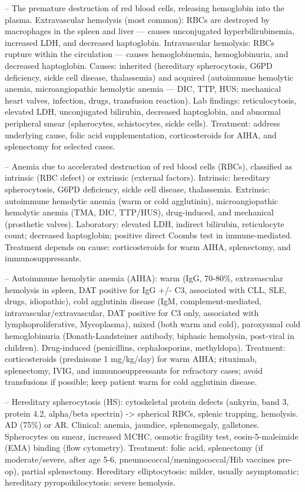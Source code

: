 -- The premature destruction of red blood cells, releasing hemoglobin into the plasma. Extravascular hemolysis (most common): RBCs are destroyed by macrophages in the spleen and liver — causes unconjugated hyperbilirubinemia, increased LDH, and decreased haptoglobin. Intravascular hemolysis: RBCs rupture within the circulation — causes hemoglobinemia, hemoglobinuria, and decreased haptoglobin. Causes: inherited (hereditary spherocytosis, G6PD deficiency, sickle cell disease, thalassemia) and acquired (autoimmune hemolytic anemia, microangiopathic hemolytic anemia — DIC, TTP, HUS; mechanical heart valves, infection, drugs, transfusion reaction). Lab findings: reticulocytosis, elevated LDH, unconjugated bilirubin, decreased haptoglobin, and abnormal peripheral smear (spherocytes, schistocytes, sickle cells). Treatment: address underlying cause, folic acid supplementation, corticosteroids for AIHA, and splenectomy for selected cases.

-- Anemia due to accelerated destruction of red blood cells (RBCs), classified as intrinsic (RBC defect) or extrinsic (external factors). Intrinsic: hereditary spherocytosis, G6PD deficiency, sickle cell disease, thalassemia. Extrinsic: autoimmune hemolytic anemia (warm or cold agglutinin), microangiopathic hemolytic anemia (TMA, DIC, TTP/HUS), drug-induced, and mechanical (prosthetic valves). Laboratory: elevated LDH, indirect bilirubin, reticulocyte count; decreased haptoglobin; positive direct Coombs test in immune-mediated. Treatment depends on cause: corticosteroids for warm AIHA, splenectomy, and immunosuppressants.

-- Autoimmune hemolytic anemia (AIHA): warm (IgG, 70-80\%, extravascular hemolysis in spleen, DAT positive for IgG +/- C3, associated with CLL, SLE, drugs, idiopathic), cold agglutinin disease (IgM, complement-mediated, intravascular/extravascular, DAT positive for C3 only, associated with lymphoproliferative, Mycoplasma), mixed (both warm and cold), paroxysmal cold hemoglobinuria (Donath-Landsteiner antibody, biphasic hemolysin, post-viral in children). Drug-induced (penicillins, cephalosporins, methyldopa). Treatment: corticosteroids (prednisone 1 mg/kg/day) for warm AIHA; rituximab, splenectomy, IVIG, and immunosuppressants for refractory cases; avoid transfusions if possible; keep patient warm for cold agglutinin disease.

-- Hereditary spherocytosis (HS): cytoskeletal protein defects (ankyrin, band 3, protein 4.2, alpha/beta spectrin) -> spherical RBCs, splenic trapping, hemolysis. AD (75\%) or AR. Clinical: anemia, jaundice, splenomegaly, gallstones. Spherocytes on smear, increased MCHC, osmotic fragility test, eosin-5-maleimide (EMA) binding (flow cytometry). Treatment: folic acid, splenectomy (if moderate/severe, after age 5-6, pneumococcal/meningococcal/Hib vaccines pre-op), partial splenectomy. Hereditary elliptocytosis: milder, usually asymptomatic; hereditary pyropoikilocytosis: severe hemolysis.

